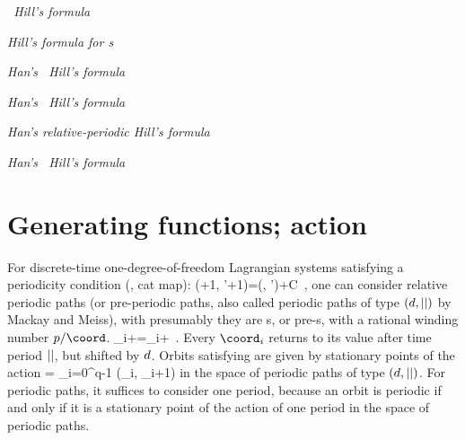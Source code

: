  {\em \catLatt\ Hill's formula}


 {\em Hill's formula for \rpo s}


 {\em Han's \templatt\ Hill's formula}


 {\em Han's  \catlatt\ Hill's formula}


 {\em Han's relative-periodic Hill's formula}


 {\em Han's  \HenonMap\ Hill's formula}











\section{Generating functions; action}
\label{LiTom17b:GenFctn}

For discrete-time one-degree-of-freedom Lagrangian systems satisfying a
periodicity condition (\ie, cat map):
\beq
\genF(\coord+1, \coord'+1)=\genF(\coord, \coord')+C
\,,
one can consider relative periodic paths (or pre-periodic paths, also called
periodic paths of type $(d,{||})$ by Mackay and Meiss), with
     {presumably they are \rpo s, or pre-\po s, with a rational
    winding number $p/\coord$.}
\beq
\coord_{i+\cl{}}=\coord_{i}+\shift
\,.
Every $\coord_{i}$ returns to its value after time period ${||}$, but shifted by
$d$.
Orbits satisfying  are given by stationary points of the action
\beq
\action = \sum_{i=0}^{q-1} \genF(\coord_i, \coord_{i+1})
in the space of periodic paths of type $(d,{||})$.
For periodic paths, it suffices to consider one period, because an orbit is periodic if
and only if it is a stationary point of the action of one period in the space
of periodic paths.

